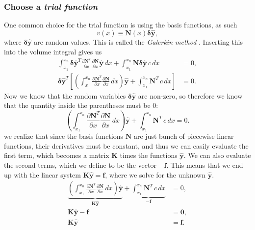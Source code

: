 \documentclass[acmtog]{acmart}
\begin{document}
\subsubsection{Choose a \textit{trial function}}
One common choice for the trial function is using the basis functions, as such
%
\begin{equation}
  v(x) \equiv \boldsymbol N(x) \boldsymbol {\delta\hat{y}},
\end{equation}
%
where $\boldsymbol{\delta \hat{y}}$ are random values. This is called the
\textit{Galerkin method} . Inserting this into the volume integral gives us
%
\begin{align}
  \int_{x_1}^{x_n} \boldsymbol {\delta \hat{y}}^T\frac{ \partial \boldsymbol N^T }{ \partial x } \frac{ \partial \boldsymbol N}{ \partial x } \boldsymbol {\hat{y}} \, dx + \int_{x_1}^{x_n} \boldsymbol N \boldsymbol {\delta \hat{y}} \, c \, dx   & = 0, \\
  \boldsymbol {\delta \hat{y}}^T\left[\left(  \int_{x_1}^{x_n} \frac{ \partial \boldsymbol N^T }{ \partial x } \frac{ \partial \boldsymbol N}{ \partial x } \, dx \right) \boldsymbol {\hat{y}} + \int_{x_1}^{x_n} \boldsymbol N^T\, c \, dx \right] & = 0.
\end{align}
%
Now we know that the random variables $\boldsymbol{\delta \hat{y}}$ are
non-zero, so therefore we know that the quantity inside the parentheses must be
0:
%
\begin{equation}
  \left(  \int_{x_1}^{x_n} \frac{ \partial \boldsymbol N^T }{ \partial x } \frac{ \partial \boldsymbol N}{ \partial x } \, dx \right) \boldsymbol {\hat{y}} + \int_{x_1}^{x_n} \boldsymbol N^T\, c \, dx = 0.
\end{equation}
%
we realize that since the basis functions $\boldsymbol N$ are just bunch of
piecewise linear functions, their derivatives must be constant, and thus we can
easily evaluate the first term, which becomes a matrix $\boldsymbol K$ times
the functions $\boldsymbol{\hat{y}}$. We can also evaluate the second terms,
which we define to be the vector $- \mathbf f$. This means that we end up with
the linear system $\boldsymbol K \boldsymbol{\hat{y}} = \mathbf f$, where we
solve for the unknown $\boldsymbol{\hat{y}}$.
%
\begin{align}
  \underbrace{ \left(  \int_{x_1}^{x_n} \frac{ \partial \boldsymbol N^T }{ \partial x } \frac{ \partial \boldsymbol N}{ \partial x } \, dx \right) \boldsymbol {\hat{y}} }_{ \boldsymbol K \boldsymbol {\hat{y}} } + \underbrace{ \int_{x_1}^{x_n} \boldsymbol N^T\, c \, dx}_{ - \mathbf f } & = 0,             \\
  \boldsymbol K \boldsymbol {\hat{y}} - \mathbf f                                                                                                                                                                                                                                             & = \boldsymbol 0, \\
  \boldsymbol K \boldsymbol {\hat{y}}                                                                                                                                                                                                                                                         & = \mathbf f.
\end{align}
\end{document}
